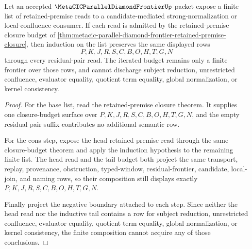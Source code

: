 \begin{theorem}
\label{thm:metacic-parallel-diamond-frontier-retained-premise-induction}
Let an accepted $\MetaCICParallelDiamondFrontierUp$ packet expose a finite list of retained-premise reads to a candidate-mediated strong-normalization or local-confluence consumer. If each read is admitted by the retained-premise closure budget of \autoref{thm:metacic-parallel-diamond-frontier-retained-premise-closure}, then induction on the list preserves the same displayed rows
$$
P,K,J,R,S,C,B,O,H,T,G,N
$$
through every residual-pair read. The iterated budget remains only a finite frontier over those rows, and cannot discharge subject reduction, unrestricted confluence, evaluator equality, quotient term equality, global normalization, or kernel consistency.
\end{theorem}
\begin{proof}
For the base list, read the retained-premise closure theorem. It supplies one closure-budget surface over $P,K,J,R,S,C,B,O,H,T,G,N$, and the empty residual-pair suffix contributes no additional semantic row.

For the cons step, expose the head retained-premise read through the same closure-budget theorem and apply the induction hypothesis to the remaining finite list. The head read and the tail budget both project the same transport, replay, provenance, obstruction, typed-window, residual-frontier, candidate, local-join, and naming rows, so their composition still displays exactly $P,K,J,R,S,C,B,O,H,T,G,N$.

Finally project the negative boundary attached to each step. Since neither the head read nor the inductive tail contains a row for subject reduction, unrestricted confluence, evaluator equality, quotient term equality, global normalization, or kernel consistency, the finite composition cannot acquire any of those conclusions.
\end{proof}

